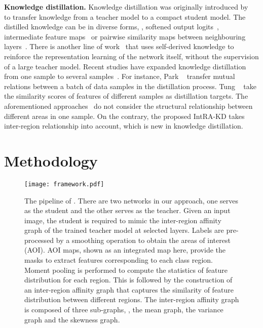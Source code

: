 \documentclass[10pt,twocolumn,letterpaper]{article}
\begin{document}
\noindent \textbf{Knowledge distillation.} Knowledge distillation was originally introduced by~\cite{hinton2015distilling} to transfer knowledge from a teacher model to a compact student model. The distilled knowledge can be in diverse forms, \eg, softened output logits~\cite{hinton2015distilling}, intermediate feature maps~\cite{gao2018embarrassingly, hou2019learningto, liu2019structured, zhu2018bidirectional} or pairwise similarity maps between neighbouring layers~\cite{yim2017gift}. There is another line of work~\cite{hou2019learning, sun2019deeply} that uses self-derived knowledge to reinforce the representation learning of the network itself, without the supervision of a large teacher model. Recent studies have expanded knowledge distillation from one sample to several samples~\cite{liu2019knowledge, park2019relational, peng2019correlation, tung2019similarity}. For instance, Park \etal ~\cite{park2019relational} transfer mutual relations between a batch of data samples in the distillation process. Tung \etal ~\cite{tung2019similarity} take the similarity scores of features of different samples as distillation targets. The aforementioned approaches~\cite{liu2019knowledge, park2019relational, peng2019correlation, tung2019similarity} do not consider the structural relationship between different areas in one sample. On the contrary, the proposed IntRA-KD takes inter-region relationship into account, which is new in knowledge distillation.  

 
\section{Methodology}
\label{sec:methodology}


\begin{figure*}[t]
  \centering
  \texttt{[image: framework.pdf]}
  \caption{The pipeline of \algorithmname. There are two networks in our approach, one serves as the student and the other serves as the teacher. Given an input image, the student is required to mimic the inter-region affinity graph of the trained teacher model at selected layers. Labels are pre-processed by a smoothing operation to obtain the areas of interest (AOI). AOI maps, shown as an integrated map here, provide the masks to extract features corresponding to each class region. Moment pooling is performed to compute the statistics of feature distribution for each region. This is followed by the construction of an inter-region affinity graph that captures the similarity of feature distribution between different regions. The inter-region affinity graph is composed of three sub-graphs, \ie, the mean graph, the variance graph and the skewness graph.}
  \centering 
  \vskip -0.4cm
  \label{fig:pipeline}
\end{figure*}
\end{document}
